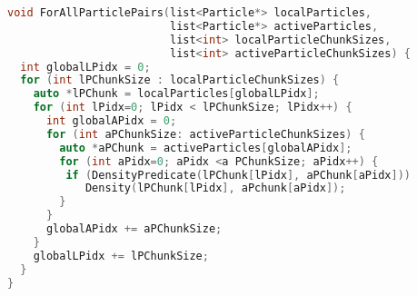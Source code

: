 \begin{lstlisting}[language=C++,
                   label=algorithm:kernel-variants:coalesced,
                   caption=Rewrite of the algorithm exploiting the fact that we know that some particle chunks are stored consecutively in memory,
                   basicstyle=\footnotesize]
void ForAllParticlePairs(list<Particle*> localParticles,
                         list<Particle*> activeParticles,
                         list<int> localParticleChunkSizes,
                         list<int> activeParticleChunkSizes) {
  int globalLPidx = 0;
  for (int lPChunkSize : localParticleChunkSizes) {
    auto *lPChunk = localParticles[globalLPidx];
    for (int lPidx=0; lPidx < lPChunkSize; lPidx++) {
      int globalAPidx = 0;
      for (int aPChunkSize: activeParticleChunkSizes) {
        auto *aPChunk = activeParticles[globalAPidx];
        for (int aPidx=0; aPidx <a PChunkSize; aPidx++) {
         if (DensityPredicate(lPChunk[lPidx], aPChunk[aPidx]))
            Density(lPChunk[lPidx], aPchunk[aPidx]);
        }
      }
      globalAPidx += aPChunkSize;
    }
    globalLPidx += lPChunkSize;
  }
}
\end{lstlisting}
